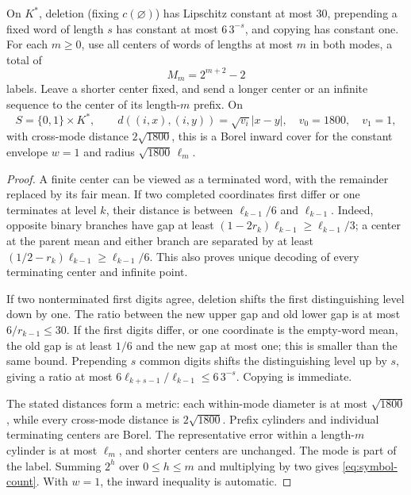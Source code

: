 \begin{lemma}\label{lem:symbol-gains}
On $K^*$, deletion (fixing $c(\varnothing)$) has Lipschitz constant at most $30$, prepending a fixed word of length $s$ has constant at most $6\,3^{-s}$, and copying has constant one. For each $m\ge0$, use all centers of words of lengths at most $m$ in both modes, a total of
\begin{equation}\label{eq:symbol-count}
 M_m=2^{m+2}-2
\end{equation}
labels. Leave a shorter center fixed, and send a longer center or an infinite sequence to the center of its length-$m$ prefix. On
\[
 S=\{0,1\}\times K^*,\qquad
 d((i,x),(i,y))=\sqrt{v_i}|x-y|,
 \quad v_0=1800,
 \quad v_1=1,
\]
with cross-mode distance $2\sqrt{1800}$, this is a Borel inward cover for the constant envelope $w=1$ and radius $\sqrt{1800}\,\ell_m$.
\end{lemma}
\begin{proof}
A finite center can be viewed as a terminated word, with the remainder replaced by its fair mean. If two completed coordinates first differ or one terminates at level $k$, their distance is between $\ell_{k-1}/6$ and $\ell_{k-1}$. Indeed, opposite binary branches have gap at least $(1-2r_k)\ell_{k-1}\ge\ell_{k-1}/3$; a center at the parent mean and either branch are separated by at least $(1/2-r_k)\ell_{k-1}\ge\ell_{k-1}/6$. This also proves unique decoding of every terminating center and infinite point.

If two nonterminated first digits agree, deletion shifts the first distinguishing level down by one. The ratio between the new upper gap and old lower gap is at most $6/r_{k-1}\le30$. If the first digits differ, or one coordinate is the empty-word mean, the old gap is at least $1/6$ and the new gap at most one; this is smaller than the same bound. Prepending $s$ common digits shifts the distinguishing level up by $s$, giving a ratio at most $6\ell_{k+s-1}/\ell_{k-1}\le6\,3^{-s}$. Copying is immediate.

The stated distances form a metric: each within-mode diameter is at most $\sqrt{1800}$, while every cross-mode distance is $2\sqrt{1800}$. Prefix cylinders and individual terminating centers are Borel. The representative error within a length-$m$ cylinder is at most $\ell_m$, and shorter centers are unchanged. The mode is part of the label. Summing $2^h$ over $0\le h\le m$ and multiplying by two gives \eqref{eq:symbol-count}. With $w=1$, the inward inequality is automatic.
\end{proof}

